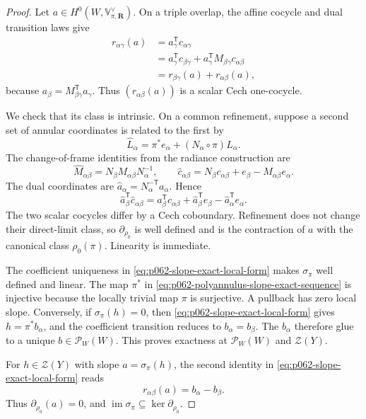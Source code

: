 \begin{proof}
Let $a\in H^0(W,\mathbb V_{\pi,\mathbf R}^{\vee})$.  On a triple overlap,
the affine cocycle and dual transition laws give
\begin{align*}
 r_{\alpha\gamma}(a)
 &=a_\gamma^{\mathsf T}c_{\alpha\gamma}\\
 &=a_\gamma^{\mathsf T}c_{\beta\gamma}
   +a_\gamma^{\mathsf T}M_{\beta\gamma}c_{\alpha\beta}\\
 &=r_{\beta\gamma}(a)+r_{\alpha\beta}(a),
\end{align*}
because
$a_\beta=M_{\beta\gamma}^{\mathsf T}a_\gamma$.  Thus
$(r_{\alpha\beta}(a))$ is a scalar Cech one-cocycle.

We check that its class is intrinsic.  On a common refinement, suppose a
second set of annular coordinates is related to the first by
\[
 \widehat L_\alpha
 =\pi^*e_\alpha+(N_\alpha\circ\pi)L_\alpha.
\]
The change-of-frame identities from the radiance construction are
\[
 \widehat M_{\alpha\beta}
 =N_\beta M_{\alpha\beta}N_\alpha^{-1},
 \qquad
 \widehat c_{\alpha\beta}
 =N_\beta c_{\alpha\beta}
  +e_\beta-\widehat M_{\alpha\beta}e_\alpha.
\]
The dual coordinates are
$\widehat a_\alpha=N_\alpha^{-\mathsf T}a_\alpha$.  Hence
\[
 \widehat a_\beta^{\mathsf T}\widehat c_{\alpha\beta}
 =a_\beta^{\mathsf T}c_{\alpha\beta}
  +\widehat a_\beta^{\mathsf T}e_\beta
  -\widehat a_\alpha^{\mathsf T}e_\alpha.
\]
The two scalar cocycles differ by a Cech coboundary.  Refinement does not
change their direct-limit class, so $\partial_{\rho_0}$ is well defined and
is the contraction of $a$ with the canonical class $\rho_0(\pi)$.
Linearity is immediate.

The coefficient uniqueness in \eqref{eq:p062-slope-exact-local-form} makes
$\sigma_\pi$ well defined and linear.  The map $\pi^*$ in
\eqref{eq:p062-polyannulus-slope-exact-sequence} is injective because the
locally trivial map $\pi$ is surjective.  A pullback has zero local slope.
Conversely, if $\sigma_\pi(h)=0$, then
\eqref{eq:p062-slope-exact-local-form} gives $h=\pi^*b_\alpha$, and the
coefficient transition reduces to $b_\alpha=b_\beta$.  The $b_\alpha$
therefore glue to a unique $b\in\mathscr P_W(W)$.  This proves exactness at
$\mathscr P_W(W)$ and $\mathscr Z(Y)$.

For $h\in\mathscr Z(Y)$ with slope $a=\sigma_\pi(h)$, the second identity
in \eqref{eq:p062-slope-exact-local-form} reads
\[
 r_{\alpha\beta}(a)=b_\alpha-b_\beta.
\]
Thus $\partial_{\rho_0}(a)=0$, and
$\operatorname{im}\sigma_\pi\subseteq\ker\partial_{\rho_0}$.


\end{proof}

